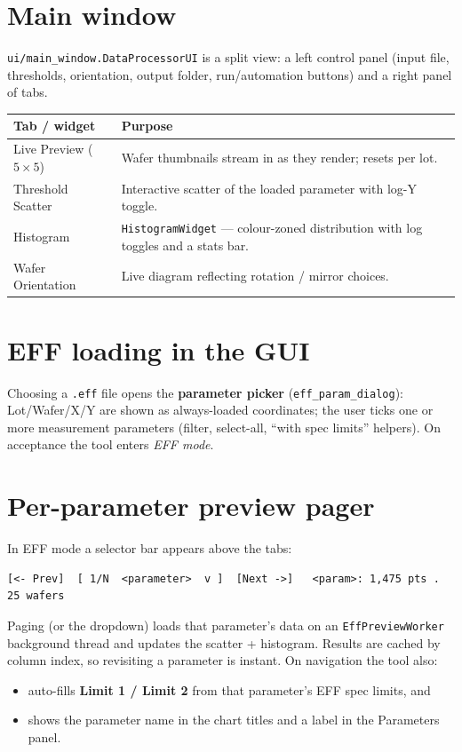 \documentclass[11pt,a4paper]{report}
\newcommand{\code}[1]{\texttt{#1}}
\begin{document}
\section{Main window}
\code{ui/main\_window.DataProcessorUI} is a split view: a left control panel
(input file, thresholds, orientation, output folder, run/automation buttons) and
a right panel of tabs.

\begin{longtable}{@{}p{4.2cm}p{10.3cm}@{}}
\toprule
\textbf{Tab / widget} & \textbf{Purpose}\\
\midrule
\endhead
Live Preview ($5\times5$) & Wafer thumbnails stream in as they render; resets per
  lot.\\
Threshold Scatter & Interactive scatter of the loaded parameter with log-Y
  toggle.\\
Histogram & \code{HistogramWidget} — colour-zoned distribution with log toggles
  and a stats bar.\\
Wafer Orientation & Live diagram reflecting rotation / mirror choices.\\
\bottomrule
\end{longtable}

\section{EFF loading in the GUI}
Choosing a \code{.eff} file opens the \textbf{parameter picker}
(\code{eff\_param\_dialog}): Lot/Wafer/X/Y are shown as always-loaded
coordinates; the user ticks one or more measurement parameters (filter,
select-all, ``with spec limits'' helpers). On acceptance the tool enters
\emph{EFF mode}.

\section{Per-parameter preview pager}
In EFF mode a selector bar appears above the tabs:
\begin{lstlisting}[style=plain]
[<- Prev]  [ 1/N  <parameter>  v ]  [Next ->]   <param>: 1,475 pts . 25 wafers
\end{lstlisting}
Paging (or the dropdown) loads that parameter's data on an
\code{EffPreviewWorker} background thread and updates the scatter + histogram.
Results are cached by column index, so revisiting a parameter is instant. On
navigation the tool also:
\begin{itemize}[leftmargin=1.4em]
  \item auto-fills \textbf{Limit 1 / Limit 2} from that parameter's EFF spec
        limits, and
  \item shows the parameter name in the chart titles and a label in the
        Parameters panel.
\end{itemize}
\end{document}
